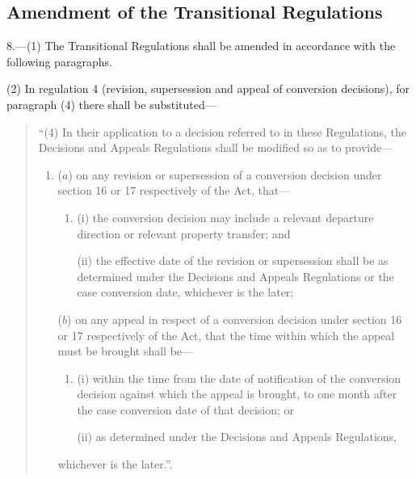 \documentclass[12pt,a4paper]{article}
\begin{document}
\subsection[8. Amendment of the Transitional Regulations]{Amendment of the Transitional Regulations}

8.---(1)  The Transitional Regulations shall be amended in accordance with the following paragraphs.

(2) In regulation 4 (revision, supersession and appeal of conversion decisions), for paragraph (4) there shall be substituted—
\begin{quotation}
“(4) In their application to a decision referred to in these Regulations, the Decisions and Appeals Regulations shall be modified so as to provide—
\begin{enumerate}\item[]
($a$) on any revision or supersession of a conversion decision under section 16 or 17 respectively of the Act, that—
\begin{enumerate}\item[]
(i) the conversion decision may include a relevant departure direction or relevant property transfer; and

(ii) the effective date of the revision or supersession shall be as determined under the Decisions and Appeals Regulations or the case conversion date, whichever is the later;
\end{enumerate}

($b$) on any appeal in respect of a conversion decision under section 16 or 17 respectively of the Act, that the time within which the appeal must be brought shall be—
\begin{enumerate}\item[]
(i) within the time from the date of notification of the conversion decision against which the appeal is brought, to one month after the case conversion date of that decision; or

(ii) as determined under the Decisions and Appeals Regulations,
\end{enumerate}
whichever is the later.”.
\end{enumerate}
\end{quotation}
\end{document}
